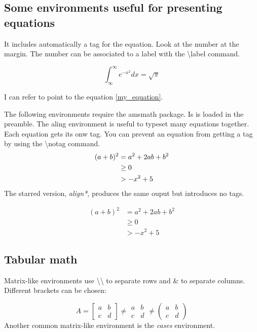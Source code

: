 \documentclass[a4paper]{article}
\newcommand{\bs}[1]{{\color{blue}\textbackslash{}#1}}
\begin{document}
\subsection{Some environments useful for presenting equations}


It includes automatically a tag for the equation. Look at the number at the margin. The number can be associated to a label with the \bs{label} command. 

  \begin{equation}\label{my_equation}
    \int_{\infty}^\infty e^{-x^2} dx = \sqrt{\pi}
  \end{equation}

I can refer to point to the equation \ref{my_equation}.\\


The following environments require the {\ttfamily amsmath} package. Is is loaded in the preamble. The aling environment is useful to typeset many equations together. Each equation gets its onw tag. You can prevent an equation from getting a tag by using the \bs{notag} command.
%
  \begin{align}
    (a+b)^2 &= a^2 + 2ab + b^2 \\
      & \geq 0 \\
      & > - x^2 +5 \notag
   \end{align}
%   
The starred version, \emph{align*}, produces the same ouput but introduces no tags.

  \begin{align*}
    (a+b)^2 &= a^2 + 2ab + b^2 \\
      & \geq 0 \\
      & > - x^2 +5
  \end{align*}
   
\subsection{Tabular math}

  Matrix-like environments use \bs{\bs{}} to separate rows and \& to separate columns. Different brackets can be chosen:
  

  $$%
    A = %
    \begin{bmatrix}
      a & b \\ c & d
    \end{bmatrix} \neq %
    \begin{matrix}
      a & b \\ c & d
    \end{matrix} \neq %
    \begin{pmatrix}
      a & b \\ c & d
    \end{pmatrix}
  $$
%
Another common matrix-like environment is the \emph{cases} environment.
\end{document}
